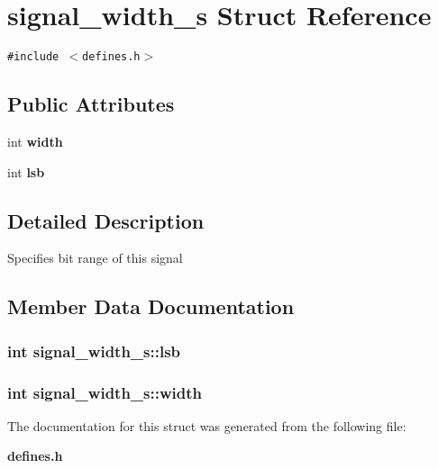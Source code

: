 \section{signal\_\-width\_\-s  Struct Reference}
\label{structsignal__width__s}
{\tt \#include $<$defines.h$>$}

\subsection*{Public Attributes}
\begin{CompactItemize}
\item 
int {\bf width}
\item 
int {\bf lsb}
\end{CompactItemize}


\subsection{Detailed Description}
Specifies bit range of this signal 



\subsection{Member Data Documentation}
\subsubsection{\setlength{\rightskip}{0pt plus 5cm}int signal\_\-width\_\-s::lsb}\label{structsignal__width__s_m1}


\subsubsection{\setlength{\rightskip}{0pt plus 5cm}int signal\_\-width\_\-s::width}\label{structsignal__width__s_m0}




The documentation for this struct was generated from the following file:\begin{CompactItemize}
\item 
{\bf defines.h}\end{CompactItemize}
